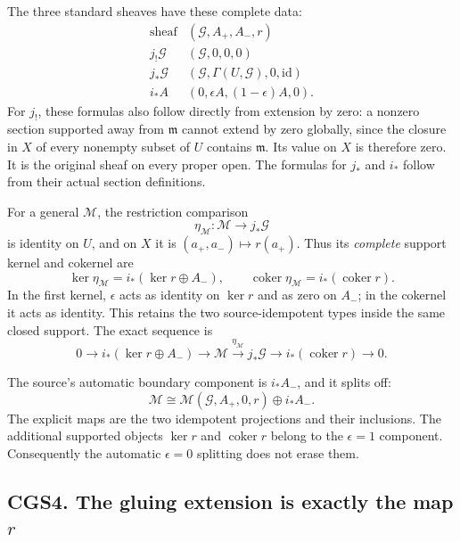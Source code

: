 The three standard sheaves have these complete data: \[
 \begin{array}{c|c}
 \text{sheaf}&(\mathcal G,A_+,A_-,r)\\ \hline
 j_!\mathcal G&(\mathcal G,0,0,0)\\
 j_*\mathcal G&(\mathcal G,\Gamma(U,\mathcal G),0,\mathrm{id})\\
 i_*A&(0,\epsilon A,(1-\epsilon)A,0).
 \end{array}
\tag{CGS3.1}
\] For \(j_!\), these formulas also follow directly from extension by
zero: a nonzero section supported away from \(\mathfrak m\) cannot
extend by zero globally, since the closure in \(X\) of every nonempty
subset of \(U\) contains \(\mathfrak m\). Its value on \(X\) is
therefore zero. It is the original sheaf on every proper open. The
formulas for \(j_*\) and \(i_*\) follow from their actual section
definitions.

For a general \(\mathcal M\), the restriction comparison \[
 \eta_{\mathcal M}:\mathcal M\longrightarrow j_*\mathcal G
\tag{CGS3.2}
\] is identity on \(U\), and on \(X\) it is \((a_+,a_-)\mapsto r(a_+)\).
Thus its \emph{complete} support kernel and cokernel are \[
 \ker\eta_{\mathcal M}
 =i_*(\ker r\oplus A_-),\qquad
 \operatorname{coker}\eta_{\mathcal M}=i_*(\operatorname{coker}r).
\tag{CGS3.3}
\] In the first kernel, \(\epsilon\) acts as identity on \(\ker r\) and
as zero on \(A_-\); in the cokernel it acts as identity. This retains
the two source-idempotent types inside the same closed support. The
exact sequence is \[
 0\to i_*(\ker r\oplus A_-)\to\mathcal M
 \xrightarrow{\eta_{\mathcal M}}j_*\mathcal G
 \to i_*(\operatorname{coker}r)\to0.
\tag{CGS3.4}
\]

The source's automatic boundary component is \(i_*A_-\), and it splits
off: \[
 \mathcal M\cong
 \mathcal M(\mathcal G,A_+,0,r)\oplus i_*A_-.
\tag{CGS3.5}
\] The explicit maps are the two idempotent projections and their
inclusions. The additional supported objects \(\ker r\) and
\(\operatorname{coker}r\) belong to the \(\epsilon=1\) component.
Consequently the automatic \(\epsilon=0\) splitting does not erase them.

\subsection{\texorpdfstring{CGS4. The gluing extension is exactly the
map
\(r\)}{CGS4. The gluing extension is exactly the map r}}\label{cgs4.-the-gluing-extension-is-exactly-the-map-r}

